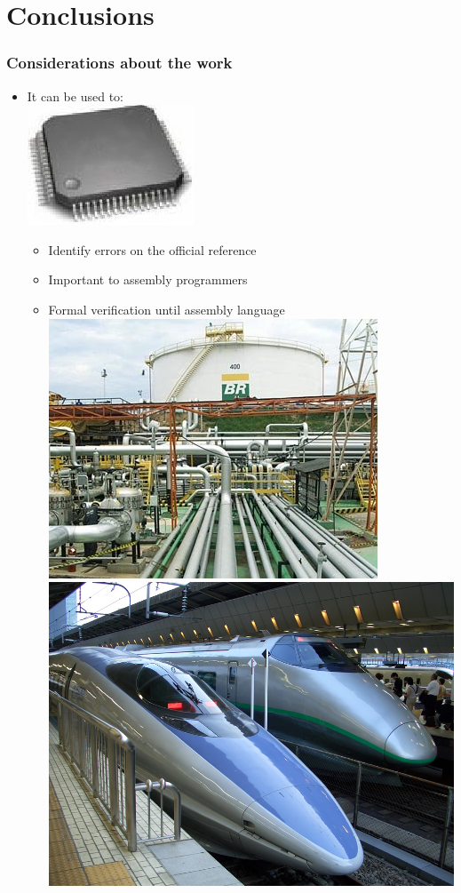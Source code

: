 \section{Conclusions}





 \begin{frame}
 \frametitle{Considerations about the work}
    
 \begin{itemize}
   \item It can be used to: \ \ \ \ \ \ \ \ \ \ \ \ \ \ \ \ \ \ \ \ \ \ \ \ \ \ \ \ \ \ \ 
    \includegraphics[width=.2\textwidth]{figures/processador_generico.jpg}
 	\begin{itemize} 
 	  \item Identify  errors on the official reference
 	  \item Important to  assembly programmers
 	  \item Formal verification until assembly language \\
 	   \includegraphics[height=.25\textheight]{figures/dutos.png} \ \ \ \ \ \ \ \ \ \ 
        \includegraphics[height=.25\textheight]{figures/trem_bala2.png} 
 	\end{itemize} 
 \end{itemize} 
  	

\end{frame}
